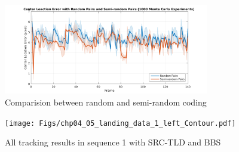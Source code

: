 \begin{figure}[!th]
	\centering
	\includegraphics[width=0.8\textwidth]{Figs/chp04_24_random_semi_random_monte_carlo.pdf}
	\caption{Comparision between random and semi-random coding}
	\label{fig:chp04_24_random_semi_random_monte_carlo}    
\end{figure}

\begin{figure}[!th]
	\centering
	\texttt{[image: Figs/chp04\_05\_landing\_data\_1\_left\_Contour.pdf]}
	\caption{All tracking results in sequence 1 with SRC-TLD and BBS}
	\label{fig:chp04_05_landing_data_1_left_Contour}    
\end{figure}

